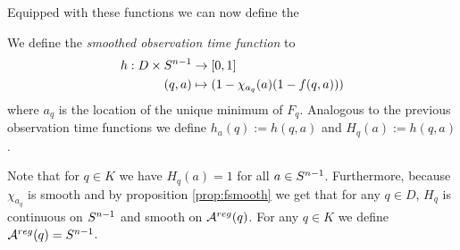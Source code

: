 Equipped with these functions we can now define the
\begin{definition}
    We define the \emph{smoothed observation time function} to 
    \begin{align*}
        h:D\times {S^{n-1}} &\to [0,1] \\
        (q,a)&\mapsto (1-\chi_{a_q}(a)(1-f(q,a)))
    \end{align*}
    where $a_q$ is the location of the unique minimum of $F_q$.
    Analogous to the previous observation time functions we define $h_a(q):=h(q,a)$ and $H_q(a):=h(q,a)$.
\end{definition}
\begin{remark}
    Note that for $q\in K$ we have $H_q(a)=1$ for all $a\in {S^{n-1}}$. Furthermore, because $\chi_{a_q}$ is smooth and by proposition \ref{prop:fsmooth} we get that for any $q\in D$, $H_q$ is continuous on ${S^{n-1}}$ and smooth on ${{\mathcal{A}}^{reg}}(q)$. For any $q\in K$ we define ${{\mathcal{A}}^{reg}}(q)={S^{n-1}}$.
\end{remark}

